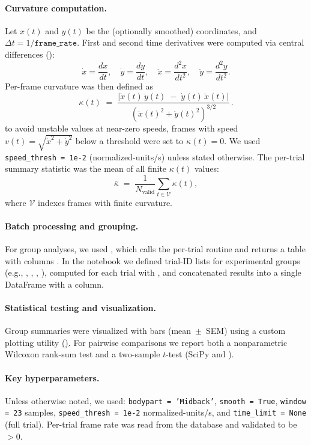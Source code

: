 \paragraph{Curvature computation.}
Let $x(t)$ and $y(t)$ be the (optionally smoothed) coordinates, and $\Delta t = 1/\texttt{frame\_rate}$. First and second time derivatives were computed via central differences ():
\[
\dot{x}=\frac{dx}{dt},\quad \dot{y}=\frac{dy}{dt},\quad
\ddot{x}=\frac{d^2x}{dt^2},\quad \ddot{y}=\frac{d^2y}{dt^2}.
\]
Per-frame curvature was then defined as
\[
\kappa(t) \;=\; \frac{\left| \dot{x}(t)\,\ddot{y}(t)\;-\;\dot{y}(t)\,\ddot{x}(t) \right|}
{\left( \dot{x}(t)^2 + \dot{y}(t)^2 \right)^{3/2}} \, .
\]
to avoid unstable values at near-zero speeds, frames with speed $v(t)=\sqrt{\dot{x}^2+\dot{y}^2}$ below a threshold were set to $\kappa(t)=0$. We used \texttt{speed\_thresh = 1e-2} (normalized-units/s) unless stated otherwise. The per-trial summary statistic was the mean of all finite $\kappa(t)$ values:
\[
\overline{\kappa} \;=\; \frac{1}{N_\text{valid}}\sum_{t \in \mathcal{V}} \kappa(t),
\]
where $\mathcal{V}$ indexes frames with finite curvature.

\paragraph{Batch processing and grouping.}
For group analyses, we used , which calls the per-trial routine and returns a table with columns . In the notebook we defined trial-ID lists for experimental groups (e.g., , , , ), computed  for each trial with , and concatenated results into a single DataFrame with a  column.

\paragraph{Statistical testing and visualization.}
Group summaries were visualized with bars (mean~$\pm$~SEM) using a custom plotting utility \href{https://github.com/atanugiri/GhrelinBehaviorQuantification/blob/main/Python_scripts/Data_analysis/plot_groupwise_bar.py}{()}. For pairwise comparisons we report both a nonparametric Wilcoxon rank-sum test and a two-sample $t$-test (SciPy  and ).

\paragraph{Key hyperparameters.}
Unless otherwise noted, we used: \texttt{bodypart = 'Midback'}, \texttt{smooth = True}, \texttt{window = 23} samples, \texttt{speed\_thresh = 1e-2} normalized-units/s, and \texttt{time\_limit = None} (full trial). Per-trial frame rate was read from the database and validated to be $>0$.

